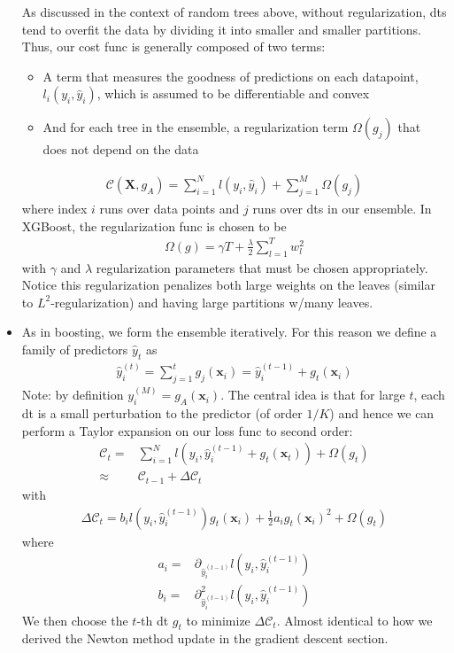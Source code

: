 \documentclass[norsk,a4paper,11pt]{article}
\begin{document}
\begin{itemize}
	As discussed in the context of random trees above, without regularization, dts tend to overfit the data by dividing it into smaller and smaller partitions. Thus, our cost func is generally composed of two terms: 
	\begin{itemize}
		\item A term that measures the goodness of predictions on each datapoint, $l_i (y_i, \hat{y}_i)$, which is assumed to be differentiable and convex
		\item And for each tree in the ensemble, a regularization term $\Omega(g_j)$ that does not depend on the data
	\end{itemize}
	\begin{align}
		\mathcal{C} (\bm{X}, g_A) = \sum_{i=1}^N l(y_i, \hat{y}_i) + \sum_{j=1}^M \Omega(g_j)
	\end{align}
	where index $i$ runs over data points and $j$ runs over dts in our ensemble. In XGBoost, the regularization func is chosen to be
	\begin{align}
		\Omega(g) = \gamma T + \frac{\lambda}{2} \sum_{l=1}^T w_l^2
	\end{align}
	with $\gamma$ and $\lambda$ regularization parameters that must be chosen appropriately. Notice this regularization penalizes both large weights on the leaves (similar to $L^2$-regularization) and having large partitions w/many leaves.
	\item As in boosting, we form the ensemble iteratively. For this reason we define a family of predictors $\hat{y}_t$ as 
	\begin{align}
		\hat{y}_i^{(t)} = \sum_{j=1}^t g_j (\bm{x}_i) = \hat{y}_i^{(t-1)} + g_t (\bm{x}_i)
	\end{align}
	Note: by definition $y_i^{(M)} = g_A (\bm{x}_i)$. The central idea is that for large $t$, each dt is a small perturbation to the predictor (of order $1/K$) and hence we can perform a Taylor expansion on our loss func to second order:
	\begin{align}
		\mathcal{C}_t =& \sum_{i=1}^N l(y_i, \hat{y}_i^{(t-1)} + g_t(\bm{x}_t)) + \Omega (g_t) \\
		\approx & \mathcal{C}_{t-1} + \Delta \mathcal{C}_t
	\end{align}
	with
	\begin{align}
		\Delta \mathcal{C}_t = b_i l(y_i, \hat{y}_i^{(t-1)}) g_t(\bm{x}_i) + \frac{1}{2}a_i g_t (\bm{x}_i)^2 + \Omega(g_t)
	\end{align}
	where
	\begin{align}
		a_i =& \partial_{\hat{y}_i^{(t-1)}} l(y_i, \hat{y}_i^{(t-1)}) \\
		b_i =& \partial_{\hat{y}_i^{(t-1)}}^2 l(y_i, \hat{y}_i^{(t-1)})
	\end{align}
	We then choose the $t$-th dt $g_t$ to minimize $\Delta \mathcal{C}_t$. Almost identical to how we derived the Newton method update in the gradient descent section.


\end{itemize}
\end{document}
